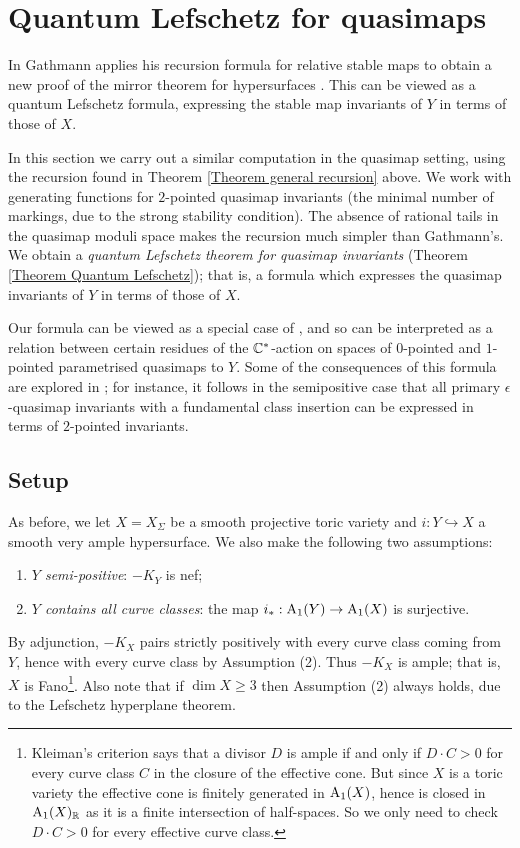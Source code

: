 \section{Quantum Lefschetz for quasimaps} \label{Section quasimap mirror theorem}

In \cite{Ga-MF} Gathmann applies his recursion formula for relative stable maps to obtain a new proof of the mirror theorem for hypersurfaces \cite{Givental-mirror} \cite{LLY1}. This can be viewed as a quantum Lefschetz formula, expressing the stable map invariants of $Y$ in terms of those of $X$.

In this section we carry out a similar computation in the quasimap setting, using the recursion found in Theorem \ref{Theorem general recursion} above. We work with generating functions for $2$-pointed quasimap invariants (the minimal number of markings, due to the strong stability condition). The absence of rational tails in the quasimap moduli space makes the recursion much simpler than Gathmann's. We obtain a \emph{quantum Lefschetz theorem for quasimap invariants} (Theorem \ref{Theorem Quantum Lefschetz}); that is, a formula which expresses the quasimap invariants of $Y$ in terms of those of $X$.

Our formula can be viewed as a special case of \cite[Corollary 5.5.1]{CF-K-wallcrossing}, and so can be interpreted as a relation between certain residues of the $\mathbb{C}^*$-action on spaces of $0$-pointed and $1$-pointed parametrised quasimaps to $Y$. Some of the consequences of this formula are explored in \cite[Section 5.5]{CF-K-wallcrossing}; for instance, it follows in the semipositive case that all primary $\epsilon$-quasimap invariants with a fundamental class insertion can be expressed in terms of $2$-pointed invariants.

\subsection{Setup} \label{Subsection setup}
As before, we let $X=X_{\Sigma}$ be a smooth projective toric variety and $i \colon Y \hookrightarrow X$ a smooth very ample hypersurface. We also make the following two assumptions:
\begin{enumerate}
\item \emph{$Y$ semi-positive}: $-K_Y$ is nef;
\item \emph{$Y$ contains all curve classes}: the map $i_* : \operatorname{A}_1(Y) \rightarrow \operatorname{A}_1(X)$ is surjective.
\end{enumerate}
By adjunction, $-K_X$ pairs strictly positively with every curve class coming from $Y$, hence with every curve class by Assumption (2). Thus $-K_X$ is ample; that is, $X$ is Fano\footnote{Kleiman's criterion says that a divisor $D$ is ample if and only if $D \cdot C > 0$ for every curve class $C$ in the closure of the effective cone. But since $X$ is a toric variety the effective cone is finitely generated in $\operatorname{A}_1(X)$, hence is closed in $\operatorname{A}_1(X)_{\mathbb{R}}$ as it is a finite intersection of half-spaces. So we only need to check $D \cdot C > 0$ for every effective curve class.}. Also note that if $\dim X \geq 3$ then Assumption (2) always holds, due to the Lefschetz hyperplane theorem.

